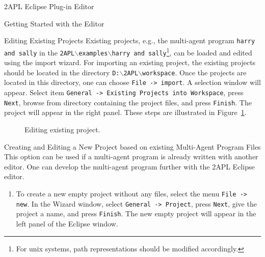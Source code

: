 \begin{chapter}{2APL Eclipse Plug-in Editor}
\begin{section}{Getting Started with the Editor}
\begin{subsection}{Editing Existing Projects}
Existing projects, e.g., the multi-agent program {\tt harry and
sally} in the {\tt 2APL$\backslash$examples$\backslash$harry and
sally}\footnote{For unix systems, path representations should be
modified accordingly.}, can be loaded and edited using the import
wizard. For importing an existing project, the existing projects
should be located in the directory
\texttt{D:$\backslash$2APL$\backslash$workspace}. Once the projects
are located in this directory, one can choose {\tt File -> import}.
A selection window will appear. Select item {\tt General -> Existing
Projects into Workspace}, press {\tt Next}, browse from directory
containing the project files, and press {\tt Finish}. The project
will appear in the right panel. These steps are illustrated in
Figure~\ref{fig:existingproject}.
    \begin{figure}[h]
            \begin{center}
            \end{center}
        \begin{minipage}{0.5\linewidth}
            \begin{center}
            \end{center}
        \end{minipage}
        \hspace{.5cm}
        \begin{minipage}{0.5\linewidth}
            \begin{center}
            \end{center}
        \end{minipage}
        \caption{Editing existing project.}\label{fig:existingproject}
    \end{figure}
\end{subsection}

\begin{subsection}{Creating and Editing a New Project based on existing Multi-Agent Program Files}
This option can be used if a multi-agent program is already written
with another editor. One can develop the multi-agent program further
with the 2APL Eclipse editor.

\begin{enumerate}
        \item To create a new empty project without any files, select the menu \texttt{File -> new}.
        In the Wizard window, select \texttt{General -> Project}, press {\tt Next}, give the project
        a name, and press {\tt Finish}. The new empty project will
        appear in the left panel of the Eclipse window.


\end{enumerate}
\end{subsection}
\end{section}
\end{chapter}
